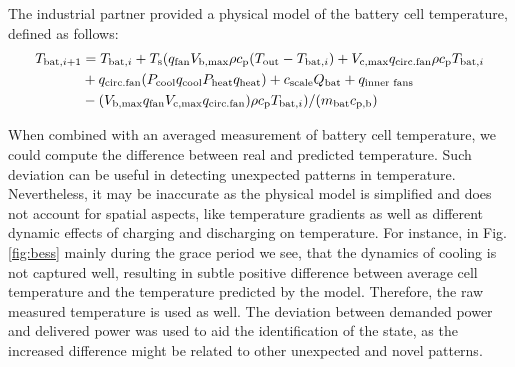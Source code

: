 The industrial partner provided a physical model of the battery cell temperature, defined as follows:
\begin{align}
 T _{\text{bat}, i+1} &= T _{\text{bat}, i} + T _{\text{s}} (q _{\text{fan}} V _{\text{b,max}} \rho c _{\text{p}} (T _{\text{out}} - T _{\text{bat}, i}) + V _{\text{c,max}}q _{\text{circ.fan}} \rho c _{\text{p}} T _{\text{bat}, i} \nonumber \\
 &+ q _{\text{circ.fan}} (P _{\text{cool}} q _{\text{cool}} P _{\text{heat}} q _{\text{heat}}) + c _{\text{scale}} Q _{\text{bat}} + q _{\text{inner fans}} \\
 &- (V _{\text{b,max}} q _{\text{fan}} V _{\text{c,max}} q _{\text{circ.fan}}) \rho c _{\text{p}} T _{\text{bat}, i}) / (m _{\text{bat}} c _{\text{p,b}}) \nonumber
\end{align}

When combined with an averaged measurement of battery cell temperature, we could compute the difference between real and predicted temperature. Such deviation can be useful in detecting unexpected patterns in temperature. Nevertheless, it may be inaccurate as the physical model is simplified and does not account for spatial aspects, like temperature gradients as well as different dynamic effects of charging and discharging on temperature. For instance, in Fig. \ref{fig:bess} mainly during the grace period we see, that the dynamics of cooling is not captured well, resulting in subtle positive difference between average cell temperature and the temperature predicted by the model. Therefore, the raw measured temperature is used as well.
The deviation between demanded power and delivered power was used to aid the identification of the state, as the increased difference might be related to other unexpected and novel patterns.

